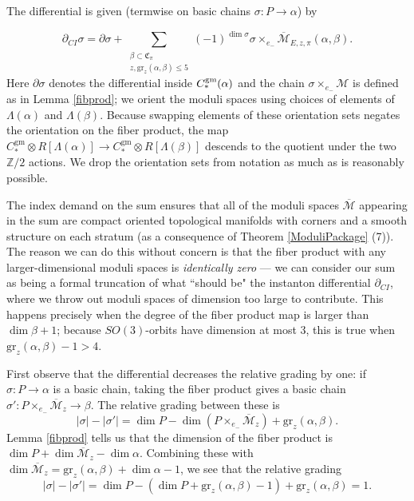 \documentclass{memo-l}
\theoremstyle{definition}
\theoremstyle{remark}
\numberwithin{section}{chapter}
\numberwithin{equation}{chapter}
\begin{document}
The differential is given (termwise on basic chains $\sigma: P \to \alpha$) by

$$\partial_{CI} \sigma = \partial \sigma + \sum_{\substack{\beta \subset \mathfrak C_\pi\\z, \text{gr}_z(\alpha, \beta) \leq 5}} (-1)^{\dim \sigma} \sigma \times_{e_-} \overline{\mathcal M}_{E,z,\pi}(\alpha, \beta).$$ 
Here $\partial \sigma$ denotes the differential inside $C_*^{\textup{gm}}(\alpha)$ and the chain $\sigma \times_{e_-} \mathcal M$ is defined as in Lemma \ref{fibprod}; we orient the moduli spaces using choices of elements of $\Lambda(\alpha)$ and $\Lambda(\beta)$. Because swapping elements of these orientation sets negates the orientation on the fiber product, the map $C_*^{\text{gm}} \otimes R[\Lambda(\alpha)] \to C_*^{\text{gm}} \otimes R[\Lambda(\beta)]$ descends to the quotient under the two $\mathbb Z/2$ actions. We drop the orientation sets from notation as much as is reasonably possible.

The index demand on the sum ensures that all of the moduli spaces $\overline{\mathcal M}$ appearing in the sum are compact oriented topological manifolds with corners and a smooth structure on each stratum (as a consequence of Theorem \ref{ModuliPackage} (7)). The reason we can do this without concern is that the fiber product with any larger-dimensional moduli spaces is \textit{identically zero} --- we can consider our sum as being a formal truncation of what ``should be" the instanton differential $\partial_{CI}$, where we throw out moduli spaces of dimension too large to contribute. This happens precisely when the degree of the fiber product map is larger than $\dim \beta + 1$; because $SO(3)$-orbits have dimension at most 3, this is true when $\text{gr}_z(\alpha, \beta) -1 > 4$.

First observe that the differential decreases the relative grading by one: if $\sigma: P \to \alpha$ is a basic chain, taking the fiber product gives a basic chain $\sigma': P \times_{e_-} \overline{\mathcal M}_z \to \beta$. The relative grading between these is $$|\sigma| - |\sigma'| = \dim P - \dim \left(P \times_{e_-} \overline{\mathcal M}_z\right) + \text{gr}_z(\alpha, \beta).$$ Lemma \ref{fibprod} tells us that the dimension of the fiber product is $\dim P + \dim \overline{\mathcal M}_z - \dim \alpha$. Combining these with $\dim \overline{\mathcal M}_z = \text{gr}_z(\alpha, \beta) + \dim \alpha - 1$, we see that the relative grading $$|\sigma| - |\sigma'| = \dim P - (\dim P + \text{gr}_z(\alpha, \beta) - 1) + \text{gr}_z(\alpha, \beta) = 1.$$
\end{document}
